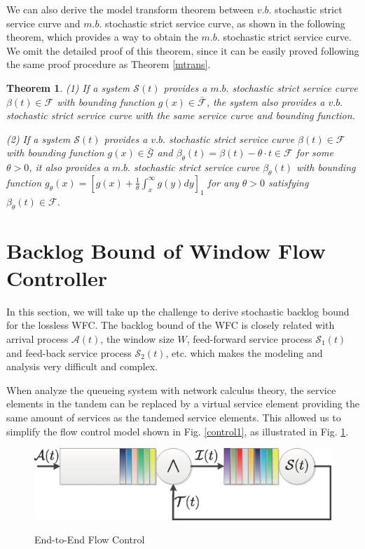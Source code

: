 \documentclass[paper]{ieice}
\newtheorem{theorem}{Theorem}
\begin{document}
We can also derive the model transform theorem between $v.b.$ stochastic strict service curve and $m.b.$ stochastic strict service curve, as shown in the following theorem, which provides a way to obtain the $m.b.$ stochastic strict service curve. We omit the detailed proof of this theorem, since it can be easily proved following the same proof procedure as Theorem \ref{mtrans}.
\begin{theorem}\label{mtrans2}
(1) If a system $\mathcal{S}(t)$ provides a $m.b.$ stochastic strict service curve $\beta(t)\in\mathcal{F}$ with bounding function $g(x)\in\bar{\mathcal{F}}$, the system also provides a $v.b.$ stochastic strict service curve with the same service curve and bounding function.

(2) If a system $\mathcal{S}(t)$ provides a $v.b.$ stochastic strict service curve $\beta(t)\in\mathcal{F}$ with bounding function $g(x)\in\bar{\mathcal{G}}$ and $\beta_{\theta}(t)=\beta(t)-\theta\cdot t\in\mathcal{F}$ for some $\theta>0$, it also provides a $m.b.$ stochastic strict service curve $\beta_{\theta}(t)$ with bounding function $g_{\theta}(x)=[g(x)+\frac{1}{\theta}\int_x^\infty g(y)dy]_1$ for any $\theta>0$ satisfying $\beta_{\theta}(t)\in\mathcal{F}$.
\end{theorem}

\section{Backlog Bound of Window Flow Controller}\label{sncloss}
In this section, we will take up the challenge to derive stochastic backlog bound for the lossless WFC. The backlog bound of the WFC is closely related with arrival process $\mathcal{A}(t)$, the window size $W$, feed-forward service process $\mathcal{S}_1(t)$ and feed-back service process $\mathcal{S}_2(t)$, etc. which makes the modeling and analysis very difficult and complex.

When analyze the queueing system with network calculus theory, the service elements in the tandem can be replaced by a virtual service element providing the same amount of services as the tandemed service elements. This allowed us to simplify the flow control model shown in Fig. \ref{control1}, as illustrated in Fig. \ref{control2}.
\begin{figure}[ht]
  \centering\includegraphics[scale=0.45]{figures/QueueModel2.eps}\\
  \caption{End-to-End Flow Control}\label{control2}
\end{figure}
\end{document}
